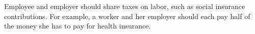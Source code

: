 Employee and employer should share taxes on labor, such as social insurance contributions. For example, a worker and her employer should each pay half of the money she has to pay for health insurance.
